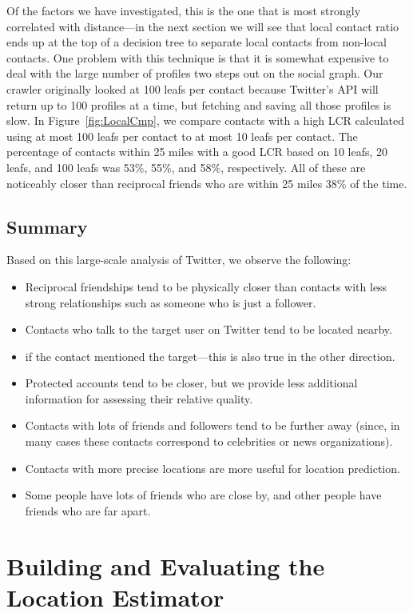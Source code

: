 \documentclass[letterpaper]{article}
\begin{document}
Of the factors we have investigated, this is the one that is most strongly
correlated with distance---in the next section we will see that local contact
ratio ends up at the top of a decision tree to separate local contacts from
non-local contacts.
%
One problem with this technique is that it is somewhat expensive to deal with
the large number of profiles two steps out on the social graph.
%
Our crawler originally looked at 100 leafs per contact because Twitter's API
will return up to 100 profiles at a time, but fetching and saving all those
profiles is slow.
%
In Figure~\ref{fig:LocalCmp}, we compare contacts with a high LCR calculated
using at most 100 leafs per contact to at most 10 leafs per contact.
%
The percentage of contacts within 25 miles with a good LCR based on 10 leafs,
20 leafs, and 100 leafs was 53\%, 55\%, and 58\%, respectively.
%
All of these are noticeably closer than reciprocal friends who are within 25
miles 38\% of the time.


\subsection{Summary}
Based on this large-scale analysis of Twitter, we observe the following: 

\begin{itemize}
\item Reciprocal friendships tend to be physically closer than contacts with less strong relationships such as someone who is just a follower.
\item Contacts who talk to the target user on Twitter tend to be located nearby.
\item if the contact mentioned the target---this is also true in the other direction.
\item Protected accounts tend to be closer, but we provide less additional information for assessing their relative quality.
\item Contacts with lots of friends and followers tend to be further away (since, in many cases these contacts correspond to celebrities or news organizations).
\item Contacts with more precise locations are more useful for location prediction.
\item Some people have lots of friends who are close by, and other people have friends who are far apart.
\end{itemize}



\section{Building and Evaluating the Location Estimator}
\end{document}
